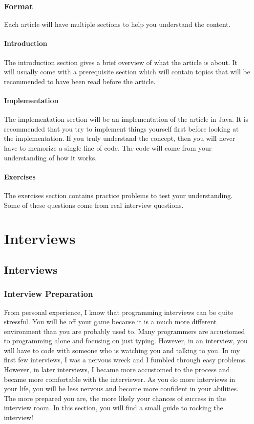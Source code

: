 \documentclass[11pt,oneside]{book}
\begin{document}
\subsection{Format}

Each article will have multiple sections to help you understand the content.

\subsubsection{Introduction}

The introduction section gives a brief overview of what the article is about. It will usually come with a prerequisite section which will contain topics that will be recommended to have been read before the article.

\subsubsection{Implementation}

The implementation section will be an implementation of the article in Java. It is recommended that you try to implement things yourself first before looking at the implementation. If you truly understand the concept, then you will never have to memorize a single line of code. The code will come from your understanding of how it works.

\subsubsection{Exercises}

The exercises section contains practice problems to test your understanding. Some of these questions come from real interview questions.

\chapter{ Interviews }
    \section{ Interviews }
    \subsection{Interview Preparation}

From personal experience, I know that programming interviews can be quite stressful. You will be off your game because it is a much more different environment than you are probably used to. Many programmers are accustomed to programming alone and focusing on just typing. However, in an interview, you will have to code with someone who is watching you and talking to you. In my first few interviews, I was a nervous wreck and I fumbled through easy problems. However, in later interviews, I became more accustomed to the process and became more comfortable with the interviewer. As you do more interviews in your life, you will be less nervous and become more confident in your abilities. The more prepared you are, the more likely your chances of success in the interview room. In this section, you will find a small guide to rocking the interview!
\end{document}
